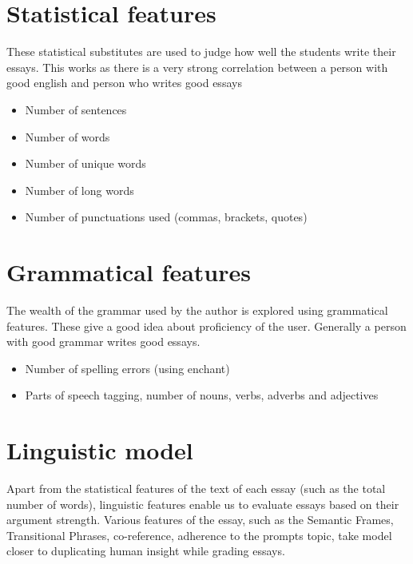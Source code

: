 \documentclass[BTech]{nitkdiss}
\begin{document}
\section{Statistical features}
These statistical substitutes are used to judge how well the students write their essays. This works as there is a very strong correlation between a person with good english and person who writes good essays
\begin{itemize}
    \item Number of sentences
	\item Number of words
	\item Number of unique words
	\item Number of long words
	\item Number of punctuations used (commas, brackets, quotes)
\end{itemize}


\section{Grammatical features}
The wealth of the grammar used by the author is explored using grammatical features. These give a good idea about proficiency of the user. Generally a person with good grammar writes good essays.

\begin{itemize}
    \item Number of spelling errors (using enchant)
	\item Parts of speech tagging, number of nouns, verbs, adverbs and adjectives
\end{itemize}
\newpage

\section{Linguistic model}
Apart from the statistical features of the text of each essay (such as the total number of words), linguistic features enable us to evaluate essays based on their argument strength. Various features of the essay, such as the Semantic Frames, Transitional Phrases, co-reference, adherence to the prompts topic, take model closer to duplicating human insight while grading essays.
\end{document}
